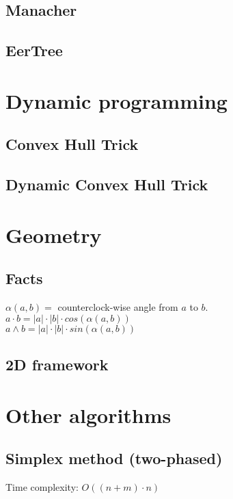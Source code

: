 \documentclass[11pt]{article}
\begin{document}
\subsection{Manacher}

\subsection{EerTree}


\section{Dynamic programming}
\subsection{Convex Hull Trick}

\subsection{Dynamic Convex Hull Trick}


\section{Geometry}
\subsection{Facts}
$\alpha(a, b) =$ counterclock-wise angle from $a$ to $b$.\\
$a \cdot b = |a| \cdot |b| \cdot cos(\alpha(a, b))$\\
$a \wedge b = |a| \cdot |b| \cdot sin(\alpha(a, b))$\\
\subsection{2D framework}

\section{Other algorithms}
\subsection{Simplex method (two-phased)}
Time complexity: $O((n + m) \cdot n)$

\end{document}
